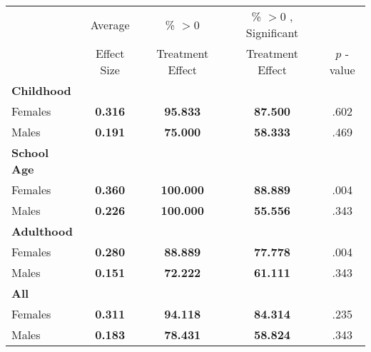 \begin{tabular}{l c c c c}
\toprule
 & Average & \% $ >0 $ & \% $ >0 $ , Significant & \citet{Rosenbaum_2005_Distribution_JRSS} \\
 & Effect Size & Treatment Effect & Treatment Effect & $ p $ -value \\
\midrule
\textbf{Childhood} & & & & \\
\quad Females &  \textbf{    0.316} & \textbf{   95.833} & \textbf{   87.500} & .602 \\
\quad Males &  \textbf{    0.191} & \textbf{   75.000} & \textbf{   58.333} & .469 \\
\midrule
\textbf{School Age} & & & & \\
\quad Females &  \textbf{    0.360} & \textbf{  100.000} & \textbf{   88.889} & .004 \\
\quad Males &  \textbf{    0.226} & \textbf{  100.000} & \textbf{   55.556} & .343 \\
\midrule
\textbf{Adulthood} & & & & \\
\quad Females &  \textbf{    0.280} & \textbf{   88.889} & \textbf{   77.778} & .004 \\
\quad Males &  \textbf{    0.151} & \textbf{   72.222} & \textbf{   61.111} & .343 \\
\midrule
\textbf{All} & & & & \\
\quad Females &  \textbf{    0.311} & \textbf{   94.118} & \textbf{   84.314} & .235 \\
\quad Males &  \textbf{    0.183} & \textbf{   78.431} & \textbf{   58.824} & .343 \\
\bottomrule
\end{tabular}
